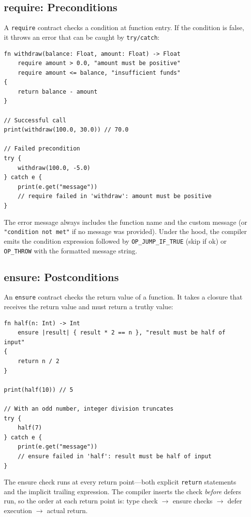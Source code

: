 \subsection{require: Preconditions}\label{sec:require-preconditions}

A \lstinline|require| contract checks a condition at function entry. If the condition is false, it throws an error that can be caught by \lstinline|try/catch|:

\begin{lstlisting}[language=Lattice, caption={require throws catchable errors}]
fn withdraw(balance: Float, amount: Float) -> Float
    require amount > 0.0, "amount must be positive"
    require amount <= balance, "insufficient funds"
{
    return balance - amount
}

// Successful call
print(withdraw(100.0, 30.0)) // 70.0

// Failed precondition
try {
    withdraw(100.0, -5.0)
} catch e {
    print(e.get("message"))
    // require failed in 'withdraw': amount must be positive
}
\end{lstlisting}

The error message always includes the function name and the custom message (or \lstinline|"condition not met"| if no message was provided). Under the hood, the compiler emits the condition expression followed by \lstinline|OP_JUMP_IF_TRUE| (skip if ok) or \lstinline|OP_THROW| with the formatted message string.

\subsection{ensure: Postconditions}\label{sec:ensure-postconditions}

An \lstinline|ensure| contract checks the return value of a function. It takes a closure that receives the return value and must return a truthy value:

\begin{lstlisting}[language=Lattice, caption={ensure validates return values}]
fn half(n: Int) -> Int
    ensure |result| { result * 2 == n }, "result must be half of input"
{
    return n / 2
}

print(half(10)) // 5

// With an odd number, integer division truncates
try {
    half(7)
} catch e {
    print(e.get("message"))
    // ensure failed in 'half': result must be half of input
}
\end{lstlisting}

The ensure check runs at every return point---both explicit \lstinline|return| statements and the implicit trailing expression. The compiler inserts the check \emph{before} defers run, so the order at each return point is: type check $\to$ ensure checks $\to$ defer execution $\to$ actual return.


